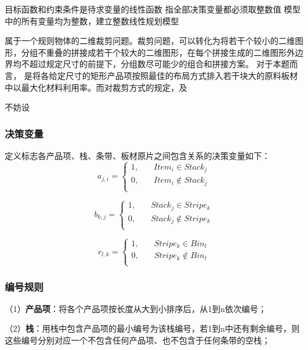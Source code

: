 \documentclass[bwprint]{gmcmthesis}
\begin{document}
目标函数和约束条件是待求变量的线性函数
指全部决策变量都必须取整数值
模型中的所有变量均为整数，建立整数线性规划模型

属于一个规则物体的二维裁剪问题。裁剪问题，可以转化为将若干个较小的二维图形，分组不重叠的拼接成若干个较大的二维图形，在每个拼接生成的二维图形外边界均不超过规定尺寸的前提下，分组数尽可能少的组合和拼接方案。
对于本题而言，
是将各给定尺寸的矩形产品项按照最佳的布局方式排入若干块大的原料板材中以最大化材料利用率。而对裁剪方式的规定，及

不妨设




\subsubsection{决策变量}
定义标志各产品项、栈、条带、板材原片之间包含关系的决策变量如下：
\begin{equation}   %
    a_{j,i}=
    \begin{cases}
        1, \quad  & Item_i \in  Stack_j \\
        0,\quad  & Item_i  \notin  Stack_j \\
    \end{cases}
\end{equation}

\begin{equation}
    b_{k,j}=
    \begin{cases}
        1, \quad  & Stack_j \in  Stripe_k \\
        0,\quad  & Stack_j  \notin  Stripe_k \\
    \end{cases}
\end{equation}

\begin{equation}
    r_{l,k}=
    \begin{cases}
        1, \quad  & Stripe_k \in  Bin_l \\
        0,\quad  & Stripe_k  \notin  Bin_l \\
    \end{cases}
\end{equation}

\subsubsection{编号规则}

（1）\textbf{产品项}：将各个产品项按长度从大到小排序后，从1到n依次编号；

（2）\textbf{栈}：用栈中包含产品项的最小编号为该栈编号，若1到n中还有剩余编号，则这些编号分别对应一个不包含任何产品项、也不包含于任何条带的空栈；
\end{document}
